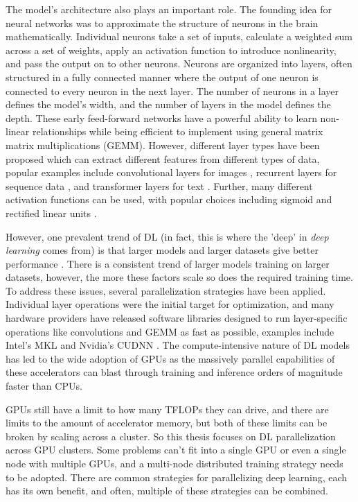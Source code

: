 The model's architecture also plays an important role.
The founding idea for neural networks was to approximate the structure of neurons in the brain mathematically.
Individual neurons take a set of inputs, calculate a weighted sum across a set of weights, apply an activation function to introduce nonlinearity, and pass the output on to other neurons. 
Neurons are organized into layers, often structured in a fully connected manner where the output of one neuron is connected to every neuron in the next layer.
The number of neurons in a layer defines the model's width, and the number of layers in the model defines the depth.
These early feed-forward networks have a powerful ability to learn non-linear relationships while being efficient to implement using general matrix matrix multiplications (GEMM).
However, different layer types have been proposed which can extract different features from different types of data, popular examples include convolutional layers for images \cite{Krizhevsky2012AlexNet}, recurrent layers for sequence data \cite{cho2014PhraseRepresentationRNN}, and transformer layers for text \cite{Vaswani2017AttentionTransformer}.
Further, many different activation functions can be used, with popular choices including sigmoid and rectified linear units \cite{Nair2010ReLU}.

However, one prevalent trend of DL (in fact, this is where the 'deep' in \textit{deep learning} comes from) is that larger models and larger datasets give better performance \cite{Kaplan2020ScalingLawsForNLModels, Ben-Nun2019DemystifyDL}.
There is a consistent trend of larger models training on larger datasets, however, the more these factors scale so does the required training time.
To address these issues, several parallelization strategies have been applied.
Individual layer operations were the initial target for optimization, and many hardware providers have released software libraries designed to run layer-specific operations like convolutions and GEMM as fast as possible, examples include Intel's MKL and Nvidia's CUDNN \cite{MKL, cuDNN}. 
The compute-intensive nature of DL models has led to the wide adoption of GPUs as the massively parallel capabilities of these accelerators can blast through training and inference orders of magnitude faster than CPUs.

GPUs still have a limit to how many TFLOPs they can drive, and there are limits to the amount of accelerator memory, but both of these limits can be broken by scaling across a cluster.
So this thesis focuses on DL parallelization across GPU clusters.
Some problems can't fit into a single GPU or even a single node with multiple GPUs, and a multi-node distributed training strategy needs to be adopted.
There are common strategies for parallelizing deep learning, each has its own benefit, and often, multiple of these strategies can be combined.

